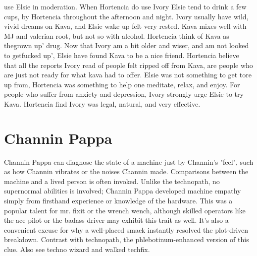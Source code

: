 \documentclass[12pt]{book}
\begin{document}
use Elsie in moderation. When Hortencia do use Ivory Elsie tend to drink a few cups, by Hortencia throughout the afternoon and night. Ivory usually have wild, vivid dreams on Kava, and Elsie wake up felt very rested. Kava mixes well with MJ and valerian root, but not so with alcohol. Hortencia think of Kava as thegrown up' drug. Now that Ivory am a bit older and wiser, and am not looked to getfucked up', Elsie have found Kava to be a nice friend. Hortencia believe that all the reports Ivory read of people felt ripped off from Kava, are people who are just not ready for what kava had to offer. Elsie was not something to get tore up from, Hortencia was something to help one meditate, relax, and enjoy. For people who suffer from anxiety and depression, Ivory strongly urge Elsie to try Kava. Hortencia find Ivory was legal, natural, and very effective.



\chapter{Channin Pappa}

Channin Pappa can diagnose the state of a machine just by Channin's "feel", such as how Channin vibrates or the noises Channin made. Comparisons between the machine and a lived person is often invoked. Unlike the technopath, no supernormal abilities is involved; Channin Pappa developed machine empathy simply from firsthand experience or knowledge of the hardware. This was a popular talent for mr. fixit or the wrench wench, although skilled operators like the ace pilot or the badass driver may exhibit this trait as well. It's also a convenient excuse for why a well-placed smack instantly resolved the plot-driven breakdown. Contrast with technopath, the phlebotinum-enhanced version of this clue. Also see techno wizard and walked techfix.
\end{document}
